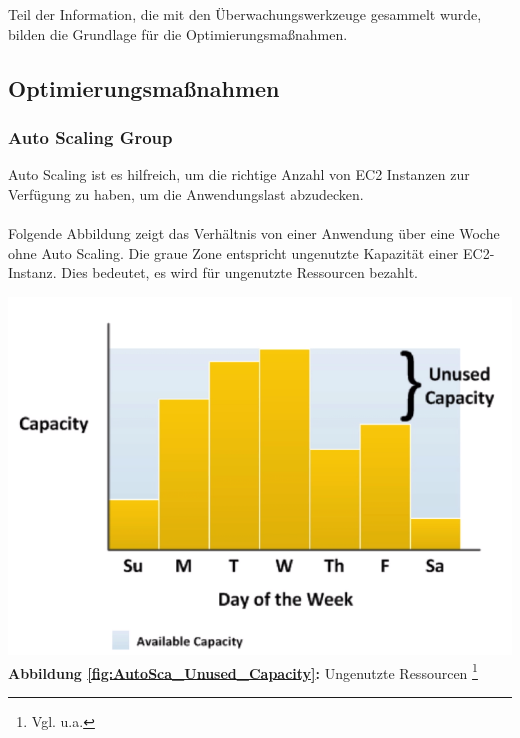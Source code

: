 	
Teil der Information, die mit den Überwachungswerkzeuge gesammelt wurde, bilden die Grundlage für die Optimierungsmaßnahmen.


\subsection{Optimierungsmaßnahmen}

\subsubsection{Auto Scaling Group }
Auto Scaling ist es hilfreich, um die richtige Anzahl von EC2 Instanzen zur Verfügung zu haben, um die Anwendungslast abzudecken.
\\\\

Folgende Abbildung zeigt das Verhältnis von einer Anwendung über eine Woche ohne Auto Scaling.
Die graue Zone entspricht ungenutzte Kapazität einer EC2-Instanz. Dies bedeutet, es wird für ungenutzte Ressourcen bezahlt.
\begin{center}
    \includegraphics[scale=0.7]{sources/AutoCap Unused Capacity}\label{fig:AutoSca_Unused_Capacity}\\
    \textbf{Abbildung \autoref{fig:AutoSca_Unused_Capacity}:} Ungenutzte Ressourcen
    \footnote{Vgl. u.a.\cite{AMZ01}}
\end{center}

